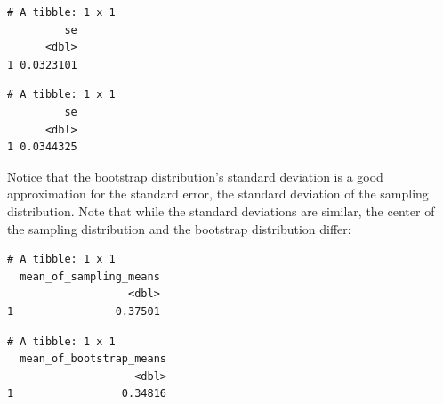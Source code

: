 \documentclass[12pt, krantz2,]{krantz}
\makeatletter
\newenvironment{Shaded}{\begin{snugshade}}{\end{snugshade}}
\newcommand{\DataTypeTok}[1]{\textcolor[rgb]{0.27,0.27,0.27}{#1}}
\newcommand{\DecValTok}[1]{\textcolor[rgb]{0.06,0.06,0.06}{#1}}
\newcommand{\KeywordTok}[1]{\textcolor[rgb]{0.27,0.27,0.27}{\textbf{#1}}}
\newcommand{\NormalTok}[1]{#1}
\newcommand{\OperatorTok}[1]{\textcolor[rgb]{0.43,0.43,0.43}{\textbf{#1}}}
\newcommand{\StringTok}[1]{\textcolor[rgb]{0.5,0.5,0.5}{#1}}
\newenvironment{kframe}{%
\medskip{}
\setlength{\fboxsep}{.8em}
 \def\at@end@of@kframe{}%
 \ifinner\ifhmode%
  \def\at@end@of@kframe{\end{minipage}}%
  \begin{minipage}{\columnwidth}%
 \fi\fi%
 \def\FrameCommand##1{\hskip\@totalleftmargin \hskip-\fboxsep
 \colorbox{shadecolor}{##1}\hskip-\fboxsep
     \hskip-\linewidth \hskip-\@totalleftmargin \hskip\columnwidth}%
 \MakeFramed {\advance\hsize-\width
   \@totalleftmargin\z@ \linewidth\hsize
   \@setminipage}}%
 {\par\unskip\endMakeFramed%
 \at@end@of@kframe}
\renewenvironment{Shaded}{\begin{kframe}}{\end{kframe}}
\makeatother
\begin{document}
\begin{verbatim}
# A tibble: 1 x 1
         se
      <dbl>
1 0.0323101
\end{verbatim}

\begin{Shaded}
\end{Shaded}

\begin{verbatim}
# A tibble: 1 x 1
         se
      <dbl>
1 0.0344325
\end{verbatim}

Notice that the bootstrap distribution's standard deviation is a good approximation for the standard error, the standard deviation of the sampling distribution. Note that while the standard deviations are similar, the center of the sampling distribution and the bootstrap distribution differ:

\begin{Shaded}
\end{Shaded}

\begin{verbatim}
# A tibble: 1 x 1
  mean_of_sampling_means
                   <dbl>
1                0.37501
\end{verbatim}

\begin{Shaded}
\end{Shaded}

\begin{verbatim}
# A tibble: 1 x 1
  mean_of_bootstrap_means
                    <dbl>
1                 0.34816
\end{verbatim}
\end{document}
